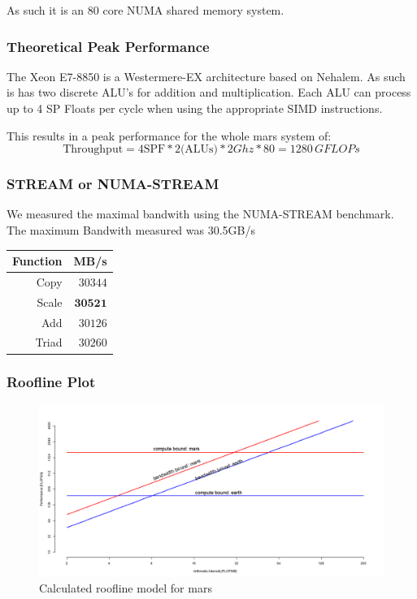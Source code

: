 As such it is an 80 core NUMA shared memory system.

\subsubsection{Theoretical Peak Performance}

The Xeon E7-8850 is a Westermere-EX architecture based on Nehalem.\cite{wikichip}
As such is has two discrete ALU's for addition and multiplication.
Each ALU can process up to 4 SP Floats per cycle when using the appropriate SIMD instructions.\cite{agnerorg}

This results in a peak performance for the whole mars system of:
$$\text{Throughput} = 4 \text{SPF} * 2 \text{(ALUs)} * 2 Ghz * 80 = 1280 \, GFLOPs$$

\subsubsection{STREAM or NUMA-STREAM}

We measured the maximal bandwith using the NUMA-STREAM benchmark.
The maximum Bandwith measured was 30.5GB/s

\begin{center}
\begin{tabular}{|r|r|}
	\hline
	Function & MB/s    \\ \hline
	Copy     & $30344$ \\ \hline
	Scale    & $\pmb{30521}$ \\ \hline
	Add      & $30126$ \\ \hline
	Triad    & $30260$ \\ \hline
\end{tabular}
\end{center}

\subsubsection{Roofline Plot}

\begin{figure}[]
	\centering
	\includegraphics[scale=.4]{figures/placeholder}
	\caption{Calculated roofline model for mars}
	\label{fig:runtime}
\end{figure}

